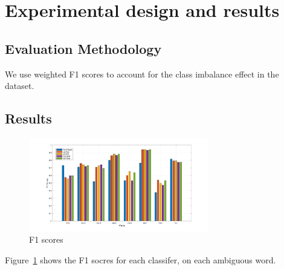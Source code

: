 \section{Experimental design and results}

\subsection{Evaluation Methodology}

We use weighted F1 scores to account for the class imbalance effect in the
dataset.

\subsection{Results}

\begin{figure}[h]
  \centering 
  \includegraphics[width=0.7\textwidth]{plots/f1.jpg}
    \caption{F1 scores}
    \label{fig:results:f1}
\end{figure}

Figure~\ref{fig:results:f1} shows the F1 socres for each classifer,
on each ambiguous word.
